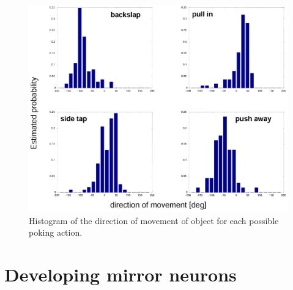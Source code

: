 \begin{figure}[tb]
\begin{center}
\includegraphics[width=12cm]{actions.eps}
\caption{ 
\label{fig:actions}
%
Histogram of the direction of movement of object for each possible poking action.
%
}
\end{center}
\end{figure}


\section{Developing mirror neurons}

